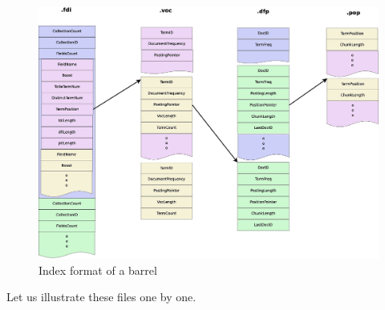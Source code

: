 \begin{figure}[h!]
\centerline{\includegraphics[width= \textwidth]{Figures/barrelFormat.jpg}}
\caption{Index format of a barrel}\label{barrelFormat}
\end{figure}
\par
Let us illustrate these files one by one.

